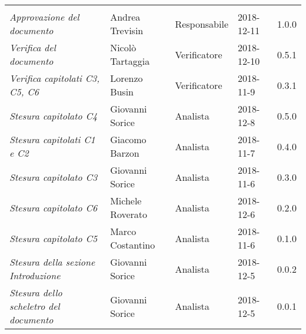 \newpage 
\section*{}
\begin{table}[H]
	\centering
	\begin{tabular}{p{4cm}|C{3cm}|C{3cm}|R{2.5cm}|R{2cm}}
		
		 & & & & \\
		
		
		\emph{Approvazione del documento} & Andrea Trevisin & Responsabile & 2018-12-11 & 1.0.0 \\
		\hline
		
		\emph{Verifica del documento} & Nicolò Tartaggia & Verificatore & 2018-12-10 & 0.5.1 \\
		\hline
		
		\emph{Verifica capitolati C3, C5, C6} & Lorenzo Busin & Verificatore & 2018-11-9 & 0.3.1 \\
		\hline
		\emph{Stesura capitolato C4 } & Giovanni Sorice & Analista & 2018-12-8 & 0.5.0 \\
		\hline
		
		\emph{Stesura capitolati C1 e C2} & Giacomo Barzon & Analista & 2018-11-7 & 0.4.0 \\
		\hline
		
		\emph{Stesura capitolato C3 } & Giovanni Sorice & Analista & 2018-11-6 & 0.3.0 \\
		\hline
		
		\emph{Stesura capitolato C6 } & Michele Roverato & Analista & 2018-12-6 & 0.2.0 \\
		\hline
		
		\emph{Stesura capitolato C5 } & Marco Costantino & Analista & 2018-11-6 & 0.1.0 \\
		\hline
		
		\emph{Stesura della sezione Introduzione } & Giovanni Sorice & Analista & 2018-12-5 & 0.0.2 \\
		\hline
		
		\emph{Stesura dello scheletro del documento} & Giovanni Sorice & Analista & 2018-12-5 & 0.0.1 \\
		
	\end{tabular}
	
\end{table}


\clearpage